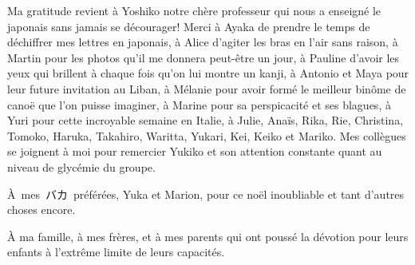 Ma gratitude revient à Yoshiko notre chère professeur qui nous a
enseigné le japonais sans jamais se décourager! Merci à Ayaka de
prendre le temps de déchiffrer mes lettres en japonais, à Alice
d'agiter les bras en l'air sans raison, à Martin pour les photos qu'il
me donnera peut-être un jour, à Pauline d'avoir les yeux qui brillent
à chaque fois qu'on lui montre un kanji, à Antonio et Maya pour leur
future invitation au Liban, à Mélanie pour avoir formé le meilleur
binôme de canoë que l'on puisse imaginer, à Marine pour sa
perspicacité et ses blagues, à Yuri pour cette incroyable semaine en
Italie, à Julie, Anaïs, Rika, Rie, Christina, Tomoko, Haruka,
Takahiro, Waritta, Yukari, Kei, Keiko et Mariko. Mes collègues se
joignent à moi pour remercier Yukiko et son attention constante quant
au niveau de glycémie du groupe.


\begin{CJK*}{UTF8}{min}%
À~mes~バカ~préférées, Yuka et Marion, pour ce noël inoubliable et tant
d'autres choses encore.
\end{CJK*}



À ma famille, à mes frères, et à mes parents qui ont poussé la
dévotion pour leurs enfants à l'extrême limite de leurs capacités.
